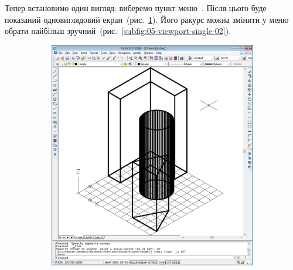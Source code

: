\documentclass[
	a4paper,
	oneside,
	BCOR = 10mm,
	DIV = 12,
	12pt,
	headings = normal,
]{scrartcl}
\newlength{\gridunitwidth}
\begin{document}
			Тепер встановимо один вигляд: виберемо пункт меню~. Після цього буде показаний одновиглядовий екран~(рис.~\ref{subfig:05-viewport-single-01}). Його ракурс можна змінити у меню~ обрати найбільш зручний~(рис.~\ref{subfig:05-viewport-single-02}).

			\begin{figure}[!htbp]
				\begin{subfigure}[b]{4 \gridunitwidth}
					\includegraphics[width = \columnwidth]{./assets/p13.png}
					\caption{}
					\label{subfig:05-viewport-single-01}
				\end{subfigure}%
				\hspace{2 \gridunitwidth}%
				\begin{subfigure}[b]{4 \gridunitwidth}
					\centering

\end{subfigure}
\end{figure}
\end{document}
